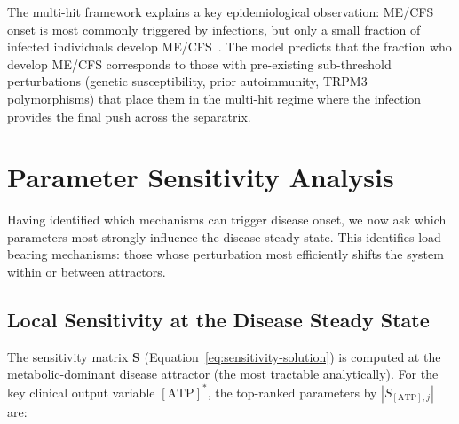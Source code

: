 The multi-hit framework explains a key epidemiological observation: ME/CFS onset is most commonly triggered by infections, but only a small fraction of infected individuals develop ME/CFS~\cite{Hickie2006postinfectious,Chu2019}. The model predicts that the fraction who develop ME/CFS corresponds to those with pre-existing sub-threshold perturbations (genetic susceptibility, prior autoimmunity, TRPM3 polymorphisms) that place them in the multi-hit regime where the infection provides the final push across the separatrix.

\section{Parameter Sensitivity Analysis}
\label{sec:sensitivity-analysis}

Having identified which mechanisms can trigger disease onset, we now ask which parameters most strongly influence the disease steady state. This identifies load-bearing mechanisms: those whose perturbation most efficiently shifts the system within or between attractors.

\subsection{Local Sensitivity at the Disease Steady State}

The sensitivity matrix $\mathbf{S}$ (Equation~\ref{eq:sensitivity-solution}) is computed at the metabolic-dominant disease attractor (the most tractable analytically). For the key clinical output variable $[\text{ATP}]^*$, the top-ranked parameters by $|S_{[\text{ATP}],j}|$ are:

